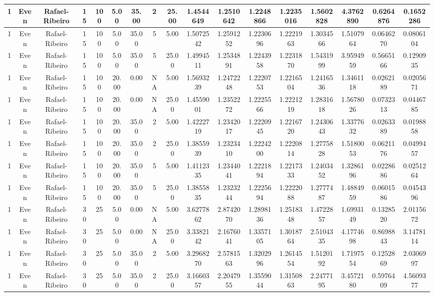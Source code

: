 \begin{longtable}{ | c | c | c | c | c | c | c | c | c | c | c | c | c | c | c | c | c | }
	\hline
	1	&	Even	&	Rafael-Ribeiro	&	15	&	100	&	5.00	&	35.00	&	2	&	25.00	&	1.4544649	&	1.2510642	&	1.2248866	&	1.2235016	&	1.5602828	&	4.3762890	&	0.6264876	&	0.1652286 \\
	\hline
	1	&	Even	&	Rafael-Ribeiro	&	15	&	100	&	5.00	&	35.00	&	5	&	5.00	&	1.5072542	&	1.2591252	&	1.2230696	&	1.2221963	&	1.3034566	&	1.5107964	&	0.0646270	&	0.0806104 \\
	\hline
	1	&	Even	&	Rafael-Ribeiro	&	15	&	100	&	5.00	&	35.00	&	5	&	25.00	&	1.4994511	&	1.2534891	&	1.2243958	&	1.2231870	&	1.5431999	&	3.9594959	&	0.5665166	&	0.1290935 \\
	\hline
	1	&	Even	&	Rafael-Ribeiro	&	15	&	100	&	20.00	&	0.00	&	NA	&	5.00	&	1.5693239	&	1.2472248	&	1.2220753	&	1.2216504	&	1.2416536	&	1.3461118	&	0.0262189	&	0.0205671 \\
	\hline
	1	&	Even	&	Rafael-Ribeiro	&	15	&	100	&	20.00	&	0.00	&	NA	&	25.00	&	1.4559001	&	1.2352272	&	1.2225566	&	1.2221219	&	1.2831618	&	1.5678026	&	0.0732313	&	0.0446785 \\
	\hline
	1	&	Even	&	Rafael-Ribeiro	&	15	&	100	&	20.00	&	35.00	&	2	&	5.00	&	1.4222719	&	1.2342017	&	1.2220945	&	1.2216720	&	1.2430643	&	1.3377632	&	0.0263389	&	0.0198858 \\
	\hline
	1	&	Even	&	Rafael-Ribeiro	&	15	&	100	&	20.00	&	35.00	&	2	&	25.00	&	1.3855939	&	1.2323410	&	1.2224200	&	1.2220814	&	1.2775828	&	1.5180053	&	0.0621176	&	0.0499457 \\
	\hline
	1	&	Even	&	Rafael-Ribeiro	&	15	&	100	&	20.00	&	35.00	&	5	&	5.00	&	1.4112335	&	1.2344041	&	1.2221894	&	1.2217333	&	1.2403452	&	1.3286196	&	0.0228686	&	0.0251264 \\
	\hline
	1	&	Even	&	Rafael-Ribeiro	&	15	&	100	&	20.00	&	35.00	&	5	&	25.00	&	1.3855835	&	1.2323244	&	1.2225694	&	1.2222088	&	1.2777487	&	1.4884959	&	0.0601586	&	0.0454396 \\
	\hline
	1	&	Even	&	Rafael-Ribeiro	&	30	&	25	&	5.00	&	0.00	&	NA	&	5.00	&	3.6277862	&	2.8742070	&	1.2898136	&	1.2518348	&	1.4722857	&	1.6993149	&	0.1328520	&	2.0115672 \\
	\hline
	1	&	Even	&	Rafael-Ribeiro	&	30	&	25	&	5.00	&	0.00	&	NA	&	25.00	&	3.3382142	&	2.1676041	&	1.3357105	&	1.3018764	&	2.5104335	&	4.1774698	&	0.8698843	&	3.1478114 \\
	\hline
	1	&	Even	&	Rafael-Ribeiro	&	30	&	25	&	5.00	&	35.00	&	2	&	5.00	&	3.2968270	&	2.5781563	&	1.3202996	&	1.2614554	&	1.5120192	&	1.7197554	&	0.1252869	&	2.0306997 \\
	\hline
	1	&	Even	&	Rafael-Ribeiro	&	30	&	25	&	5.00	&	35.00	&	2	&	25.00	&	3.1660357	&	2.2047955	&	1.3559044	&	1.3150863	&	2.2477195	&	3.4572180	&	0.5976409	&	4.5609377 \\

\end{longtable}
